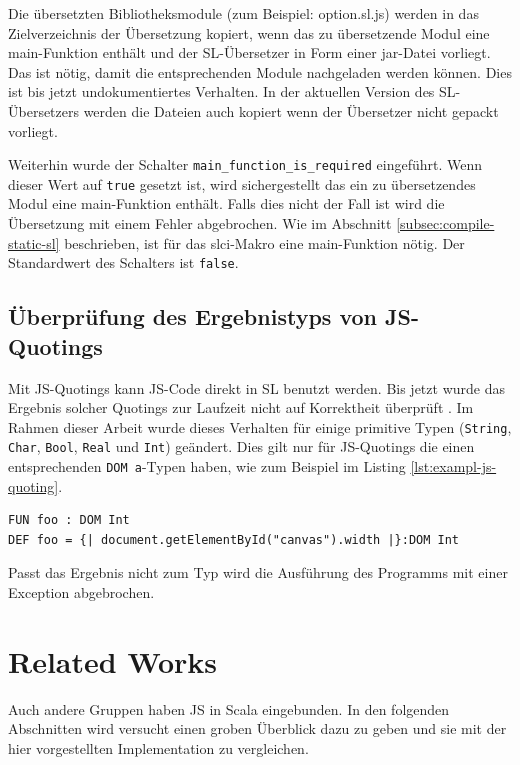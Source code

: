 \documentclass[12pt]{scrreprt}
\begin{document}
Die übersetzten Bibliotheksmodule (zum Beispiel: option.sl.js) werden in das Zielverzeichnis der Übersetzung kopiert, wenn das zu übersetzende Modul eine main-Funktion enthält und der SL-Übersetzer in Form einer jar-Datei vorliegt. Das ist nötig, damit die entsprechenden Module nachgeladen werden können. Dies ist bis jetzt undokumentiertes Verhalten. In der aktuellen Version des SL-Übersetzers werden die Dateien auch kopiert wenn der Übersetzer nicht gepackt vorliegt.

Weiterhin wurde der Schalter \lstinline!main_function_is_required! eingeführt. Wenn dieser Wert auf \lstinline!true! gesetzt ist, wird sichergestellt das ein zu übersetzendes Modul eine main-Funktion enthält. Falls dies nicht der Fall ist wird die Übersetzung mit einem Fehler abgebrochen. Wie im Abschnitt \ref{subsec:compile-static-sl} beschrieben, ist für das slci-Makro eine main-Funktion nötig. Der Standardwert des Schalters ist \lstinline!false!.

\section{Überprüfung des Ergebnistyps von \ac{JS}-Quotings}

Mit JS-Quotings kann JS-Code direkt in SL benutzt werden. Bis jetzt wurde das Ergebnis solcher Quotings zur Laufzeit nicht auf Korrektheit überprüft \cite[S. 29]{Bisping2013}. Im Rahmen dieser Arbeit wurde dieses Verhalten für einige primitive Typen (\lstinline!String!, \lstinline!Char!, \lstinline!Bool!, \lstinline!Real! und \lstinline!Int!) geändert. Dies gilt nur für JS-Quotings die einen entsprechenden \lstinline!DOM a!-Typen haben, wie zum Beispiel im Listing \ref{lst:exampl-js-quoting}.

\begin{lstlisting}[caption={Beispiel: JS-Quoting Monade}, label=lst:exampl-js-quoting]
FUN foo : DOM Int
DEF foo = {| document.getElementById("canvas").width |}:DOM Int
\end{lstlisting}

Passt das Ergebnis nicht zum Typ wird die Ausführung des Programms mit einer Exception abgebrochen.

\chapter{Related Works}
\label{chap:related-works}

Auch andere Gruppen haben JS in Scala eingebunden. In den folgenden Abschnitten wird versucht einen groben Überblick dazu zu geben und sie mit der hier vorgestellten Implementation zu vergleichen. 
\end{document}

